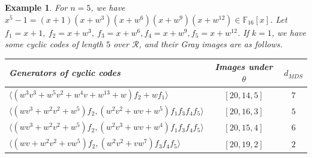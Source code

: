 \documentclass{amsart}
\newtheorem{example}[theorem]{Example}
\theoremstyle{definition}
\theoremstyle{remark}
\numberwithin{equation}{section}
\begin{document}
\begin{example}\allowdisplaybreaks
    For $n=5$, we have $x^5-1=(x+1)(x+w^3)(x+w^{6})(x+w^9)(x+w^{12})\in\mathbb F_{16}[x]$. Let $f_1=x+1,~f_2=x+w^3,~f_3=x+w^{6}, f_4=x+w^9,f_5=x+w^{12}$. If $k=1$, we have some cyclic codes of length $5$ over $\mathcal{R}$, and their Gray images are as follows.
     

{\renewcommand{\arraystretch}{1.2}{\begin{longtable}{ | l | c | c | }\hline
 Generators of cyclic codes & Images under $\theta$ & $d_{MDS}$ \\\hline	
 $\langle (w^3v^3 + w^5v^2 + w^4v + w^{13} +w )f_2 + wf_1\rangle$  &  $[20,14,5]$ & $7$ \\
	$\langle (w v^3+w^2v^2+w^5)f_2,(w^2 v^2+w v+w^5)f_1f_3f_4f_5\rangle$  &  $[20,16,3]$ & $5$ \\
	$\langle (w v^3+w^2v^2+w^5)f_2,(w^2v^3+w v +w^4 )f_1f_3f_4f_5\rangle$ &  $[20,15,4]$& $6$  \\ 
	$\langle (w v+w^2v^2+vw^5)f_2,(w^2v^2+vw^7)f_3f_4f_5\rangle$ & $[20,19,2]$ & $2$  \\\hline
\end{longtable}}}
   
\end{example}
\end{document}

